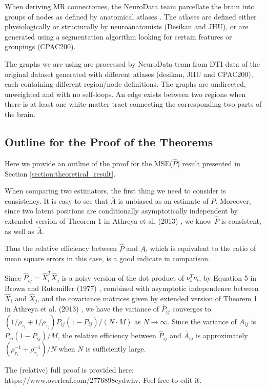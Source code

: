 \documentclass[a4paper]{article}
\begin{document}
When deriving MR connectomes, the NeuroData team parcellate the brain into groups of nodes as defined by anatomical atlases \cite{neurodata, kiar2016graph}. The atlases are defined either physiologically or structurally by neuroanatomists (Desikan and JHU), or are generated using a segmentation algorithm looking for certain features or groupings (CPAC200).

The graphs we are using are processed by NeuroData team from DTI data of the original dataset generated with different atlases (desikan, JHU and CPAC200), each containing different region/node definitions. The graphs are undirected, unweighted and with no self-loops. An edge exists between two regions when there is at least one white-matter tract connecting the corresponding two parts of the brain.


\subsection{Outline for the Proof of the Theorems}
\label{section:outline_proof}
Here we provide an outline of the proof for the MSE($\hat{P}$) result presented in Section \ref{section:theoretical_result}.
	
When comparing two estimators, the first thing we need to consider is consistency.
It is easy to see that $\bar{A}$ is unbiased as an estimate of $P$. Moreover, since two latent positions are conditionally asymptotically independent by extended version of Theorem 1 in Athreya et al. (2013) \cite{athreya2013limit}, we know $\hat{P}$ is consistent, as well as $\bar{A}$.

Thus the relative efficiency between $\hat{P}$ and $\bar{A}$, which is equivalent to the ratio of mean square errors in this case, is a good indicate in comparison.

Since $\hat{P}_{ij} = \hat{X}_i^T \hat{X}_j$ is a noisy version of the dot product of $\nu_s^T \nu_t$, by Equation 5 in Brown and Rutemiller (1977) \cite{brown1977means}, combined with asymptotic independence between $\hat{X}_i$ and $\hat{X}_j$, and the covariance matrices given by extended version of Theorem 1 in Athreya et al. (2013) \cite{athreya2013limit}, we have the variance of $\hat{P}_{ij}$ converges to $\left( 1/\rho_{\tau_i} + 1/\rho_{\tau_j} \right) P_{ij} (1-P_{ij})/(N \cdot M)$ as $N \rightarrow \infty$. Since the variance of $\bar{A}_{ij}$ is $P_{ij} (1-P_{ij})/M$, the relative efficiency between $\hat{P}_{ij}$ and $\bar{A}_{ij}$ is approximately $(\rho_{\tau_i}^{-1} + \rho_{\tau_j}^{-1})/N$ when $N$ is sufficiently large.
	
The (relative) full proof is provided here: \\
https://www.overleaf.com/2776898cydwhv. Feel free to edit it.


% 
\end{document}
